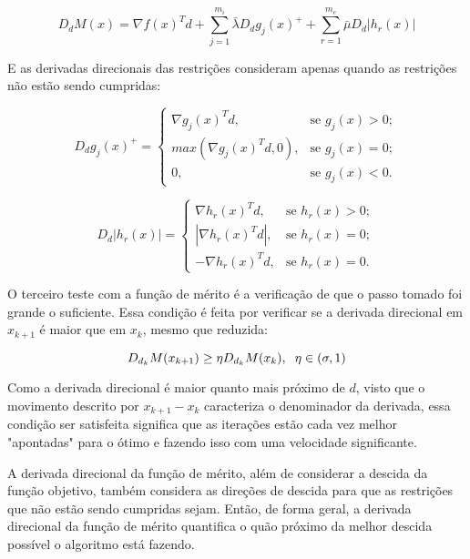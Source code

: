 \begin{equation}
  D_d M(x) = \nabla f(x)^Td + \sum_{j=1}^{m_i} \bar{\lambda} D_dg_j(x)^+ +  \sum_{r=1}^{m_e} \bar{\mu} D_d|h_r(x)|
\end{equation}


E as derivadas direcionais das restrições consideram apenas quando as restrições não estão sendo
cumpridas:

\begin{equation}
  D_dg_j(x)^+ = \begin{cases}
    \nabla g_j(x)^Td,         & \text{se } g_j(x) > 0;\\
    max(\nabla g_j(x)^Td, 0), & \text{se } g_j(x) = 0;\\
    0,                       & \text{se } g_j(x) < 0.
  \end{cases}
\end{equation}


\begin{equation}
  D_d|h_r(x)| = \begin{cases}
    \nabla h_r(x)^Td,         & \text{se } h_r(x) > 0;\\
    |\nabla h_r(x)^Td|,       & \text{se } h_r(x) = 0;\\
    -\nabla h_r(x)^Td,        & \text{se } h_r(x) = 0.
  \end{cases}
\end{equation}

O terceiro teste com a função de mérito é a verificação de que o passo tomado foi grande o
suficiente. Essa condição é feita por verificar se a derivada direcional em \(x_{k+1}\) é
maior que em \(x_k\), mesmo que reduzida:

\begin{equation}
  D_{d_k} M(x_{k+1}) \geq \eta D_{d_k} M(x_k), \hspace{0.2cm} \eta \in (\sigma, 1)
\end{equation}


Como a derivada direcional é maior quanto mais próximo de \(d\), visto que o movimento descrito
por \(x_{k+1} - x_k\) caracteriza o denominador da derivada, essa condição ser satisfeita
significa que as iterações estão cada vez melhor "apontadas" para o ótimo e fazendo isso
com uma velocidade significante.

A derivada direcional da função de mérito, além de considerar a descida da função objetivo,
também considera as direções de descida para que as restrições que não estão sendo cumpridas
sejam. Então, de forma geral, a derivada direcional da função de mérito quantifica o quão
próximo da melhor descida possível o algoritmo está fazendo.


